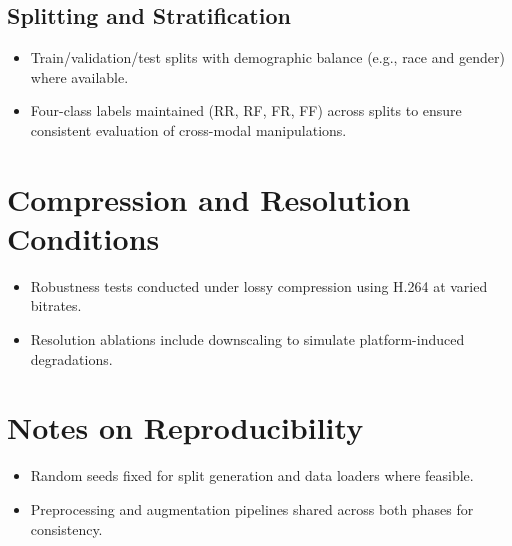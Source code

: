 \subsection{Splitting and Stratification}
\begin{itemize}
    \item Train/validation/test splits with demographic balance (e.g., race and gender) where available.
    \item Four-class labels maintained (RR, RF, FR, FF) across splits to ensure consistent evaluation of cross-modal manipulations.
\end{itemize}

\section{Compression and Resolution Conditions}
\begin{itemize}
    \item Robustness tests conducted under lossy compression using H.264 at varied bitrates.
    \item Resolution ablations include downscaling to simulate platform-induced degradations.
\end{itemize}

\section{Notes on Reproducibility}
\begin{itemize}
    \item Random seeds fixed for split generation and data loaders where feasible.
    \item Preprocessing and augmentation pipelines shared across both phases for consistency.
\end{itemize}